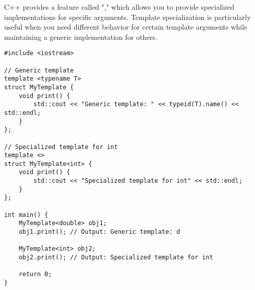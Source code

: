 \subsubsection{}

C++ provides a feature called "," which allows you to provide specialized implementations for specific  arguments. Template specialization is particularly useful when you need different behavior for certain template arguments while maintaining a generic implementation for others.
\begin{lstlisting}
#include <iostream>

// Generic template
template <typename T>
struct MyTemplate {
    void print() {
        std::cout << "Generic template: " << typeid(T).name() << std::endl;
    }
};

// Specialized template for int
template <>
struct MyTemplate<int> {
    void print() {
        std::cout << "Specialized template for int" << std::endl;
    }
};

int main() {
    MyTemplate<double> obj1;
    obj1.print(); // Output: Generic template: d

    MyTemplate<int> obj2;
    obj2.print(); // Output: Specialized template for int

    return 0;
}
\end{lstlisting}

